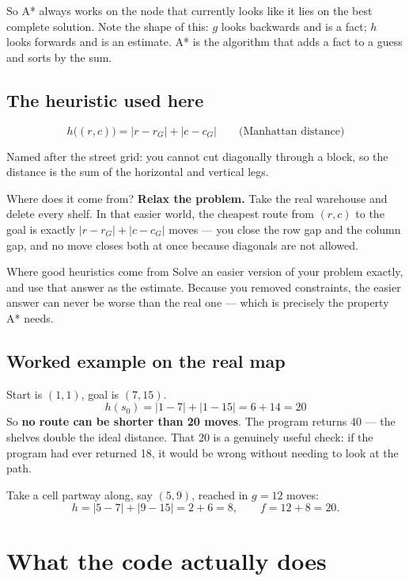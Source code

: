 \documentclass[11pt,a4paper]{article}
\begin{document}
So A* always works on the node that currently looks like it lies on the best
complete solution. Note the shape of this: $g$ looks backwards and is a fact;
$h$ looks forwards and is an estimate. A* is the algorithm that adds a fact to a
guess and sorts by the sum.

\subsection{The heuristic used here}

\[
  h\big((r,c)\big) = |r - r_G| + |c - c_G| \qquad \text{(Manhattan distance)}
\]

Named after the street grid: you cannot cut diagonally through a block, so the
distance is the sum of the horizontal and vertical legs.

Where does it come from? \textbf{Relax the problem.} Take the real warehouse and
delete every shelf. In that easier world, the cheapest route from $(r,c)$ to the
goal is exactly $|r-r_G| + |c-c_G|$ moves --- you close the row gap and the
column gap, and no move closes both at once because diagonals are not allowed.

\begin{keyidea}{Where good heuristics come from}
Solve an easier version of your problem exactly, and use that answer as the
estimate. Because you removed constraints, the easier answer can never be worse
than the real one --- which is precisely the property A* needs.
\end{keyidea}

\subsection{Worked example on the real map}

Start is $(1,1)$, goal is $(7,15)$.
\[
  h(s_0) = |1-7| + |1-15| = 6 + 14 = 20
\]
So \textbf{no route can be shorter than 20 moves}. The program returns 40 --- the
shelves double the ideal distance. That 20 is a genuinely useful check: if the
program had ever returned 18, it would be wrong without needing to look at the path.

Take a cell partway along, say $(5,9)$, reached in $g = 12$ moves:
\[
  h = |5-7| + |9-15| = 2 + 6 = 8, \qquad f = 12 + 8 = 20.
\]

\section{What the code actually does}
\end{document}
